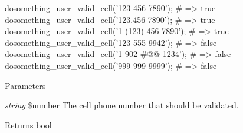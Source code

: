 \begin{DoxyCode}
  dosomething_user_valid_cell('123-456-7890');
  # => true
  dosomething_user_valid_cell('123.456 7890');
  # => true
  dosomething_user_valid_cell('1 (123) 456-7890');
  # => true
  dosomething_user_valid_cell('123-555-9942');
  # => false
  dosomething_user_valid_cell('1 902 #@@ 1234');
  # => false
  dosomething_user_valid_cell('999 999 9999');
  # => false
\end{DoxyCode}



\begin{DoxyParams}{Parameters}
\item[{\em string}]\$number The cell phone number that should be validated. \end{DoxyParams}
\begin{DoxyReturn}{Returns}
bool 
\end{DoxyReturn}
